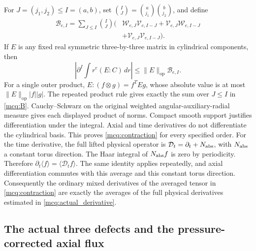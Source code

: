 \documentclass[11pt]{article}
\begin{document}
For \(J=(j_1,j_2)\le I=(a,b)\), set
\(\binom IJ=\binom a{j_1}\binom b{j_2}\), and define
\begin{equation}\label{mcq:B}
\begin{split}
 \mathcal B_{e,I}=\sum_{J\le I}\binom IJ
 \bigl(&\mathcal W_{e,J}\mathcal V_{e,I-J}
       +\mathcal V_{e,J}\mathcal W_{e,I-J}\\
       &+\mathcal V_{e,J}\mathcal V_{e,I-J}\bigr).
\end{split}
\end{equation}
If \(E\) is any fixed real symmetric three-by-three matrix in
cylindrical components, then
\begin{equation}\label{mcq:contraction}
 \left|\partial^I\int r^e(E:C)\,dr\right|
       \le \|E\|_{\mathrm{op}}\mathcal B_{e,I}.
\end{equation}
For a single outer product,
\(E:(f\otimes g)=f^TEg\), whose absolute value is at most
\(\|E\|_{\mathrm{op}}|f||g|\). The repeated product rule gives exactly
the sum over \(J\le I\) in \eqref{mcq:B}. Cauchy--Schwarz on the
original weighted angular-auxiliary-radial measure gives each displayed
product of norms. Compact smooth support justifies differentiation
under the integral. Axial and time derivatives do not differentiate
the cylindrical basis. This proves \eqref{mcq:contraction} for every
specified order.
For the time derivative, the full lifted physical operator is
\(\mathcal D_t=\partial_t+N_{\rm abs}\), with \(N_{\rm abs}\) a
constant torus direction. The Haar integral of \(N_{\rm abs}f\) is
zero by periodicity. Therefore
\(\partial_t\langle f\rangle=\langle\mathcal D_tf\rangle\).
The same identity applies repeatedly, and axial differentiation commutes
with this average and this constant torus direction. Consequently the
ordinary mixed derivatives of the averaged tensor in
\eqref{mcq:contraction} are exactly the averages of the full physical
derivatives estimated in \eqref{mcq:actual_derivative}.

\subsection{The actual three defects and the pressure-corrected axial flux}
\end{document}
